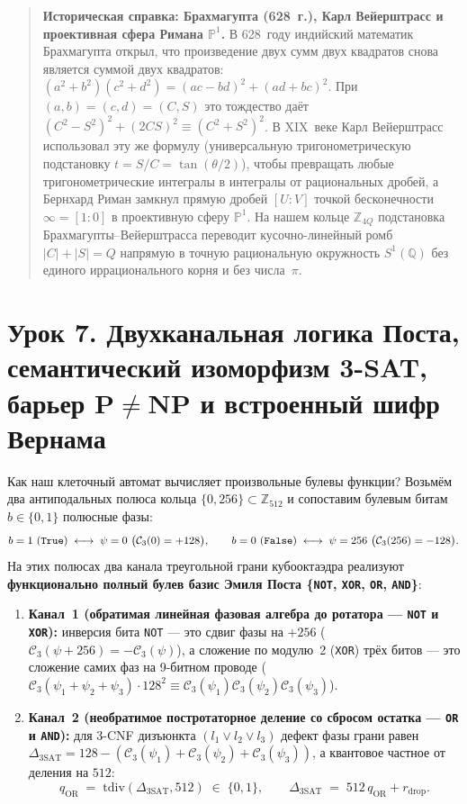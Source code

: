 \begin{quote}
\small\textbf{Историческая справка: Брахмагупта (628~г.), Карл Вейерштрасс и проективная сфера Римана $\mathbb{P}^1$.}
В 628~году индийский математик Брахмагупта открыл, что произведение двух сумм двух квадратов снова является суммой двух квадратов: $(a^2+b^2)(c^2+d^2) = (ac-bd)^2 + (ad+bc)^2$. При $(a,b)=(c,d)=(C,S)$ это тождество даёт $(C^2-S^2)^2 + (2CS)^2 \equiv (C^2+S^2)^2$. В XIX~веке Карл Вейерштрасс использовал эту же формулу (универсальную тригонометрическую подстановку $t = S/C = \tan(\theta/2)$), чтобы превращать любые тригонометрические интегралы в интегралы от рациональных дробей, а Бернхард Риман замкнул прямую дробей $[U : V]$ точкой бесконечности $\infty = [1 : 0]$ в проективную сферу $\mathbb{P}^1$. На нашем кольце $\mathbb{Z}_{4Q}$ подстановка Брахмагупты--Вейерштрасса переводит кусочно-линейный ромб $|C|+|S|=Q$ напрямую в точную рациональную окружность $S^1(\mathbb{Q})$ без единого иррационального корня и без числа~$\pi$.
\end{quote}

\section{Урок 7. Двухканальная логика Поста, семантический изоморфизм 3-SAT, барьер \texorpdfstring{$\mathbf{P}\ne\mathbf{NP}$}{P != NP} и встроенный шифр Вернама}

Как наш клеточный автомат вычисляет произвольные булевы функции? Возьмём два антиподальных полюса кольца $\{0, 256\}\subset\mathbb{Z}_{512}$ и сопоставим булевым битам $b\in\{0,1\}$ полюсные фазы:
\[
  b = 1\ (\text{\texttt{True}}) \;\longleftrightarrow\; \psi = 0\ \bigl(\mathcal{C}_3(0)=+128\bigr),
  \qquad
  b = 0\ (\text{\texttt{False}}) \;\longleftrightarrow\; \psi = 256\ \bigl(\mathcal{C}_3(256)=-128\bigr).
\]
На этих полюсах два канала треугольной грани кубооктаэдра реализуют \textbf{функционально полный булев базис Эмиля Поста \{\texttt{NOT}, \texttt{XOR}, \texttt{OR}, \texttt{AND}\}}:
\begin{enumerate}[label=\textbf{\arabic*.},noitemsep]
\item \textbf{Канал~1 (обратимая линейная фазовая алгебра до ротатора --- \texttt{NOT} и \texttt{XOR}):}
  инверсия бита \texttt{NOT} --- это сдвиг фазы на $+256$ ($\mathcal{C}_3(\psi+256) = -\mathcal{C}_3(\psi)$), а сложение по модулю~2 (\texttt{XOR}) трёх битов --- это сложение самих фаз на 9-битном проводе ($\mathcal{C}_3(\psi_1+\psi_2+\psi_3)\cdot 128^2 \equiv \mathcal{C}_3(\psi_1)\mathcal{C}_3(\psi_2)\mathcal{C}_3(\psi_3)$).
\item \textbf{Канал~2 (необратимое постротаторное деление со сбросом остатка --- \texttt{OR} и \texttt{AND}):}
  для 3-CNF дизъюнкта $(l_1\lor l_2\lor l_3)$ дефект фазы грани равен $\Delta_{\mathrm{3SAT}} = 128 - (\mathcal{C}_3(\psi_1)+\mathcal{C}_3(\psi_2)+\mathcal{C}_3(\psi_3))$, а квантовое частное от деления на $512$:
  \[
    q_{\mathrm{OR}} \;=\; \mathrm{tdiv}(\Delta_{\mathrm{3SAT}}, 512) \;\in\; \{0, 1\},
    \qquad
    \Delta_{\mathrm{3SAT}} \;=\; 512\,q_{\mathrm{OR}} + r_{\mathrm{drop}}.
  \]
\end{enumerate}

